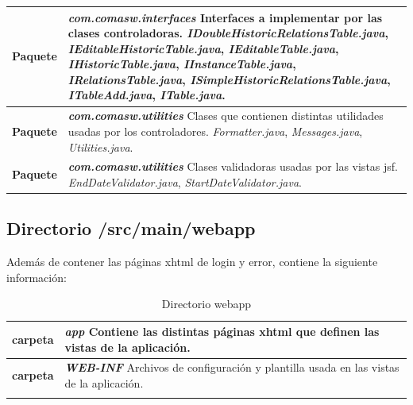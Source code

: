 \begin{longtable}{m{1cm} m{11cm}}
	\textbf{Paquete} & \textit{\textbf{com.comasw.interfaces}} \newline
     Interfaces a implementar por las clases controladoras.\newline
\textit{IDoubleHistoricRelationsTable.java},
\textit{IEditableHistoricTable.java},
\textit{IEditableTable.java},
\textit{IHistoricTable.java},
\textit{IInstanceTable.java},
\textit{IRelationsTable.java},
\textit{ISimpleHistoricRelationsTable.java},
\textit{ITableAdd.java},
\textit{ITable.java}.
	\\\hline

	\textbf{Paquete} & \textit{\textbf{com.comasw.utilities}} \newline
     Clases que contienen distintas utilidades usadas por los controladores.\newline
\textit{Formatter.java},
\textit{Messages.java},
\textit{Utilities.java}.
	\\\hline


	\textbf{Paquete} & \textit{\textbf{com.comasw.utilities}} \newline
     Clases validadoras usadas por las vistas \acrshort{jsf}.\newline
\textit{EndDateValidator.java},
\textit{StartDateValidator.java}.
	\\\hline


\end{longtable}

 


\subsection{Directorio /src/main/webapp}
\label{sub:web}
Además de contener las páginas \acrshort{xhtml} de login y error, contiene la siguiente información:


\begin{longtable}{m{1cm} m{11cm}}
    \caption{Directorio webapp}
    \label{tab:web}\\  	
    \rowcolors{2}{white}{white}
    \textbf{carpeta} & \textit{\textbf{app}} \newline
    Contiene las distintas páginas \acrshort{xhtml} que definen las vistas de la aplicación.
    \\\hline
    \textbf{carpeta} & \textit{\textbf{WEB-INF}} \newline
    Archivos de configuración y plantilla usada en las vistas de la aplicación.
	\\\hline
\\\hline

\end{longtable}    
 


